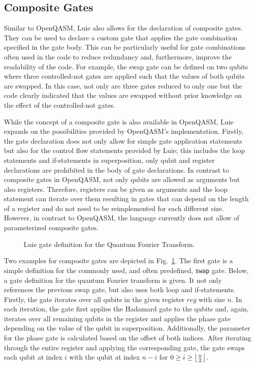 \subsection{Composite Gates}
\label{sec:concept_compositeGates}
Similar to OpenQASM, Luie also allows for the declaration of composite gates. They can be used to declare a custom gate that applies the gate combination specified in the gate body. This can be particularly useful for gate combinations often used in the code to reduce redundancy and, furthermore, improve the readability of the code. For example, the swap gate can be defined on two qubits where three controlled-not gates are applied such that the values of both qubits are swapped. In this case, not only are three gates reduced to only one but the code clearly indicated that the values are swapped without prior knowledge on the effect of the controlled-not gates.

While the concept of a composite gate is also available in OpenQASM, Luie expands on the possibilities provided by OpenQASM's implementation. Firstly, the gate declaration does not only allow for simple gate application statements but also for the control flow statements provided by Luie; this includes the loop statements and if-statements in superposition, only qubit and register declarations are prohibited in the body of gate declarations. In contrast to composite gates in OpenQASM, not only qubits are allowed as arguments but also registers. Therefore, registers can be given as arguments and the loop statement can iterate over them resulting in gates that can depend on the length of a register and do not need to be reimplemented for each different size. However, in contrast to OpenQASM, the language currently does not allow of parameterized composite gates.   

\begin{figure}[htp]
    \centering     
    
    \caption{Luie gate definition for the Quantum Fourier Transform.}
    \label{fig:qft_example}
\end{figure}

Two examples for composite gates are depicted in Fig.~\ref{fig:qft_example}. The first gate is a simple definition for the commonly used, and often predefined, \texttt{swap} gate. Below, a gate definition for the quantum Fourier transform is given. It not only references the previous swap gate, but also uses both loop and if-statements. Firstly, the gate iterates over all qubits in the given register $reg$ with size $n$. In each iteration, the gate first applies the Hadamard gate to the qubits and, again, iterates over all remaining qubits in the register and applies the phase gate depending on the value of the qubit in superposition. Additionally, the parameter for the phase gate is calculated based on the offset of both indices. After iterating through the entire register and applying the corresponding gate, the gate swaps each qubit at index $i$ with the qubit at index $n - i$ for $0 \geq i \geq \floor*{\frac{n}{2}}$.